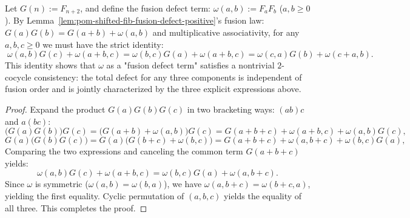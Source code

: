 \begin{proposition}\label{prop:pom-fusion-defect-2cocycle-identity}
Let $G(n):=F_{n+2}$, and define the fusion defect term:
\(
\omega(a,b):=F_aF_b
\)
($a,b\ge 0$).
By Lemma~\ref{lem:pom-shifted-fib-fusion-defect-positive}'s fusion law:
\(
G(a)G(b)=G(a+b)+\omega(a,b)
\)
and multiplicative associativity, for any $a,b,c\ge 0$ we must have the strict identity:
\[
\boxed{\;
\omega(a,b)G(c)+\omega(a+b,c)
=\omega(b,c)G(a)+\omega(a+b,c)
=\omega(c,a)G(b)+\omega(c+a,b).\;}
\]
This identity shows that $\omega$ as a "fusion defect term" satisfies a nontrivial $2$-cocycle consistency: the total defect for any three components is independent of fusion order and is jointly characterized by the three explicit expressions above.
\end{proposition}
\begin{proof}
Expand the product $G(a)G(b)G(c)$ in two bracketing ways: $(ab)c$ and $a(bc)$:
\[
\bigl(G(a)G(b)\bigr)G(c)=\bigl(G(a+b)+\omega(a,b)\bigr)G(c)=G(a+b+c)+\omega(a+b,c)+\omega(a,b)G(c),
\]
\[
G(a)\bigl(G(b)G(c)\bigr)=G(a)\bigl(G(b+c)+\omega(b,c)\bigr)=G(a+b+c)+\omega(a,b+c)+\omega(b,c)G(a),
\]
Comparing the two expressions and canceling the common term $G(a+b+c)$ yields:
\[
\omega(a,b)G(c)+\omega(a+b,c)
=\omega(b,c)G(a)+\omega(a,b+c).
\]
Since $\omega$ is symmetric ($\omega(a,b)=\omega(b,a)$), we have $\omega(a,b+c)=\omega(b+c,a)$, yielding the first equality.
Cyclic permutation of $(a,b,c)$ yields the equality of all three. This completes the proof.
\end{proof}

\endinput
